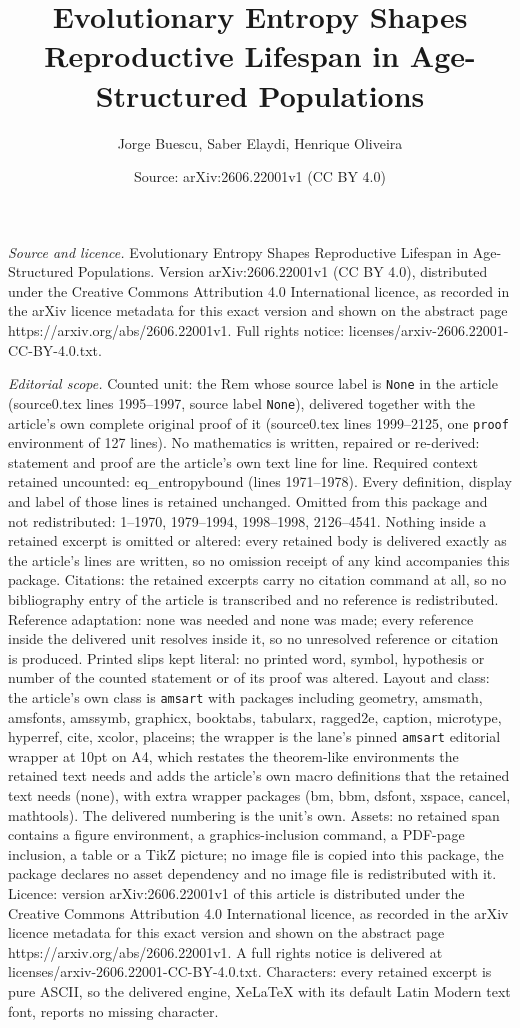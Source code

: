 \documentclass[10pt,a4paper]{amsart}
\title[Evolutionary Entropy Shapes Reproductive Lifespan in Age-Str]{Evolutionary Entropy Shapes Reproductive Lifespan in Age-Structured Populations}
\author{Jorge Buescu, Saber Elaydi, Henrique Oliveira}
\date{Source: arXiv:2606.22001v1 (CC BY 4.0)}
\begin{document}
\maketitle

\noindent\emph{Source and licence.} Evolutionary Entropy Shapes Reproductive Lifespan in Age-Structured Populations. Version arXiv:2606.22001v1 (CC BY 4.0), distributed under the Creative Commons Attribution 4.0 International licence, as recorded in the arXiv licence metadata for this exact version and shown on the abstract page https://arxiv.org/abs/2606.22001v1. Full rights notice: licenses/arxiv-2606.22001-CC-BY-4.0.txt.\par\smallskip

\noindent\textit{Editorial scope.} Counted unit: the Rem whose source label is \texttt{None} in the article (source0.tex lines 1995--1997, source label \texttt{None}), delivered together with the article's own complete original proof of it (source0.tex lines 1999--2125, one \texttt{proof} environment of 127 lines). No mathematics is written, repaired or re-derived: statement and proof are the article's own text line for line. Required context retained uncounted: eq\_entropybound (lines 1971--1978). Every definition, display and label of those lines is retained unchanged. Omitted from this package and not redistributed: 1--1970, 1979--1994, 1998--1998, 2126--4541. Nothing inside a retained excerpt is omitted or altered: every retained body is delivered exactly as the article's lines are written, so no omission receipt of any kind accompanies this package. Citations: the retained excerpts carry no citation command at all, so no bibliography entry of the article is transcribed and no reference is redistributed. Reference adaptation: none was needed and none was made; every reference inside the delivered unit resolves inside it, so no unresolved reference or citation is produced. Printed slips kept literal: no printed word, symbol, hypothesis or number of the counted statement or of its proof was altered. Layout and class: the article's own class is \texttt{amsart} with packages including geometry, amsmath, amsfonts, amssymb, graphicx, booktabs, tabularx, ragged2e, caption, microtype, hyperref, cite, xcolor, placeins; the wrapper is the lane's pinned \texttt{amsart} editorial wrapper at 10pt on A4, which restates the theorem-like environments the retained text needs and adds the article's own macro definitions that the retained text needs (none), with extra wrapper packages (bm, bbm, dsfont, xspace, cancel, mathtools). The delivered numbering is the unit's own. Assets: no retained span contains a figure environment, a graphics-inclusion command, a PDF-page inclusion, a table or a TikZ picture; no image file is copied into this package, the package declares no asset dependency and no image file is redistributed with it. Licence: version arXiv:2606.22001v1 of this article is distributed under the Creative Commons Attribution 4.0 International licence, as recorded in the arXiv licence metadata for this exact version and shown on the abstract page https://arxiv.org/abs/2606.22001v1. A full rights notice is delivered at licenses/arxiv-2606.22001-CC-BY-4.0.txt. Characters: every retained excerpt is pure ASCII, so the delivered engine, XeLaTeX with its default Latin Modern text font, reports no missing character.
\end{document}
